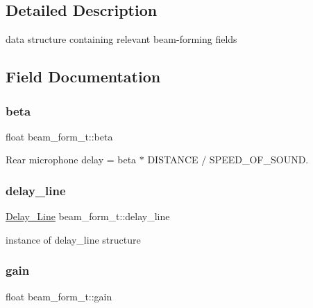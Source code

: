 \subsection{Detailed Description}
data structure containing relevant beam-\/forming fields 

\subsection{Field Documentation}
\mbox{\label{structbeam__form__t_a327d18550d19abd047f7f89711ac61fc}} 
\subsubsection{\texorpdfstring{beta}{beta}}
{\footnotesize\ttfamily float beam\+\_\+form\+\_\+t\+::beta}



Rear microphone delay = beta $\ast$ D\+I\+S\+T\+A\+N\+CE / S\+P\+E\+E\+D\+\_\+\+O\+F\+\_\+\+S\+O\+U\+ND. 

\mbox{\label{structbeam__form__t_ac6ce5ad03bc83781b2752c67b3803871}} 
\subsubsection{\texorpdfstring{delay\+\_\+line}{delay\_line}}
{\footnotesize\ttfamily \mbox{\hyperlink{delay__line_8h_aa62b49f8bfee0c3a174896c9b446d68d}{Delay\+\_\+\+Line}} beam\+\_\+form\+\_\+t\+::delay\+\_\+line}



instance of delay\+\_\+line structure 

\mbox{\label{structbeam__form__t_a0fa1b33edfad76e13c1593da0537070e}} 
\subsubsection{\texorpdfstring{gain}{gain}}
{\footnotesize\ttfamily float beam\+\_\+form\+\_\+t\+::gain}



